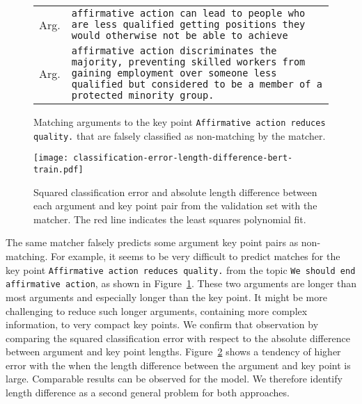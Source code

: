 \begin{figure}
    \begin{tabularx}{\linewidth}{@{}p{2em}X@{}}
        Arg. & \texttt{affirmative action can lead to people who are less qualified getting positions they would otherwise not be able to achieve} \\
        Arg. & \texttt{affirmative action discriminates the majority, preventing skilled workers from gaining employment over someone less qualified but considered to be a member of a protected minority group.}
    \end{tabularx}
    \caption{Matching arguments to the key point \texttt{Affirmative action reduces quality.} that are falsely classified as non-matching by the \BertBase matcher.}
    \label{example-5-110-113}
\end{figure}
\begin{figure}
    \texttt{[image: classification-error-length-difference-bert-train.pdf]}
    \caption{Squared classification error and absolute length difference between each argument and key point pair from the validation set with the \BertBase matcher. The red line indicates the least squares polynomial fit.}
    \label{classification-error-length}
\end{figure}
The same \BertBase matcher falsely predicts some argument key point pairs as non-matching.
For example, it seems to be very difficult to predict matches for the key point \texttt{Affirmative action reduces quality.} from the topic \texttt{We should end affirmative action}, as shown in Figure~\ref{example-5-110-113}. These two arguments are longer than most arguments %
and especially longer than the key point.
It might be more challenging to reduce such longer arguments, containing more complex information, to very compact key points.
We confirm that observation by comparing the squared classification error with respect to the absolute difference between argument and key point lengths.
Figure~\ref{classification-error-length} shows a tendency of higher error with the \BertBase when the length difference between the argument and key point is large.
Comparable results can be observed for the \Roberta model.
We therefore identify length difference as a second general problem for both approaches.
